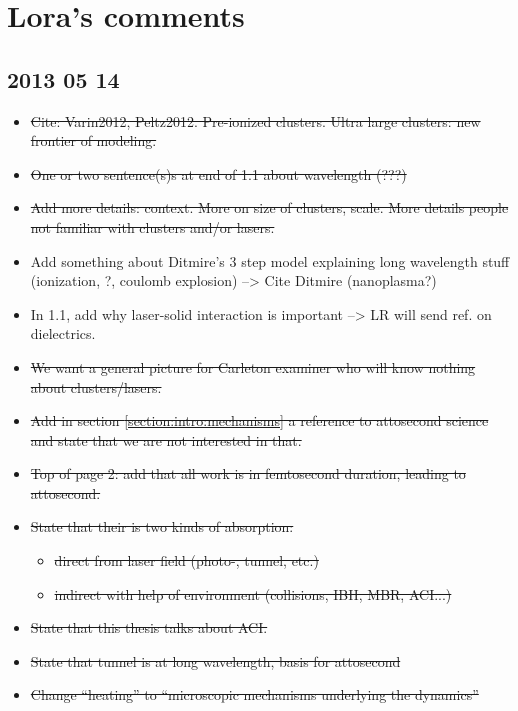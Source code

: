 \section*{Lora's comments}

\subsection*{2013 05 14}

\begin{itemize}
\item \sout{Cite: Varin2012, Peltz2012. Pre-ionized
clusters. Ultra large clusters: new frontier of modeling.}
\item \sout{One or two sentence(s)s at end of 1.1 about wavelength (???)}
\item \sout{Add more details: context. More on size of clusters, scale. More details
people not familiar with clusters and/or lasers.}
\item Add something about Ditmire's 3 step model explaining long wavelength stuff
(ionization, ?, coulomb explosion) --> Cite Ditmire (nanoplasma?)
\item In 1.1, add why laser-solid interaction is important --> LR will send ref.
on dielectrics.
\item \sout{We want a general picture for Carleton examiner who will know nothing about
clusters/lasers.}
\item \sout{Add in section \ref{section:intro:mechanisms} a reference to
attosecond science and state that we are not interested in that.}
\item \sout{Top of page 2: add that all work is in femtosecond duration, leading to
attosecond.}
\item \sout{State that their is two kinds of absorption:}
    \begin{itemize}
    \item \sout{direct from laser field (photo-, tunnel, etc.)}
    \item \sout{indirect with help of environment (collisions, IBH, MBR, ACI...)}
    \end{itemize}
\item \sout{State that this thesis talks about ACI.}
\item \sout{State that tunnel is at long wavelength, basis for attosecond}
\item \sout{Change ``heating'' to ``microscopic mechanisms underlying the dynamics''}

\end{itemize}
